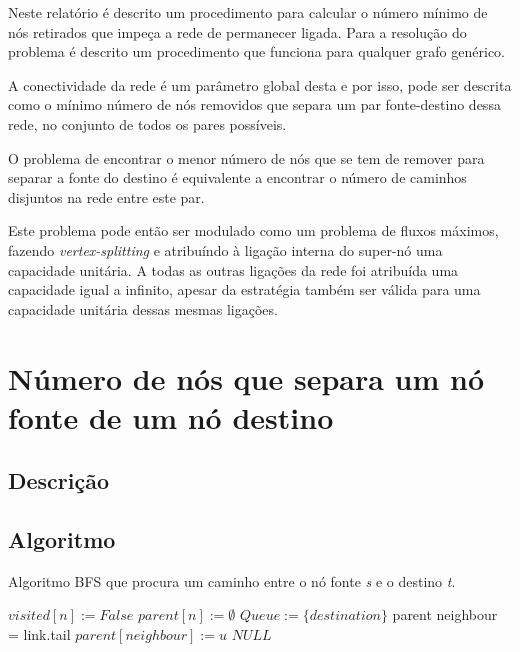 \documentclass[12pt,a4paper]{scrartcl}
\begin{document}
Neste relatório é descrito um procedimento para calcular o número mínimo de nós retirados que impeça a rede de permanecer ligada. Para a resolução do problema é descrito um procedimento que funciona para qualquer grafo genérico.

A conectividade da rede é um parâmetro global desta e por isso, pode ser descrita como o mínimo número de nós removidos que separa um par fonte-destino dessa rede, no conjunto de todos os pares possíveis.

O problema de encontrar o menor número de nós que se tem de remover para separar a fonte do destino é equivalente a encontrar o número de caminhos disjuntos na rede entre este par.

Este problema pode então ser modulado como um problema de fluxos máximos, fazendo \textit{vertex-splitting} e atribuíndo à ligação interna do super-nó uma capacidade unitária. A todas as outras ligações da rede foi atribuída uma capacidade igual a infinito, apesar da estratégia também ser válida para uma capacidade unitária dessas mesmas ligações.

\section{Número de nós que separa um nó fonte de um nó destino}

\subsection{Descrição}

\subsection{Algoritmo}

\begin{algorithm}
\caption{Algoritmo BFS que procura um caminho entre o nó fonte \textit{s} e o destino \textit{t}.}\label{alg:bfs_goal}
\begin{algorithmic}[1]
    	\State $visited[n] := False $
    	\State $parent[n] := \emptyset $
    \EndFor
    \State $Queue :=  \{destination\}$
      		\Return parent 
      \EndIf
        	\State neighbour = link.tail
				\State $parent[neighbour] := u $
            \EndIf
      \EndFor
  	\EndWhile
  	\Return $NULL$
\EndProcedure
\end{algorithmic}
\end{algorithm}
\end{document}
